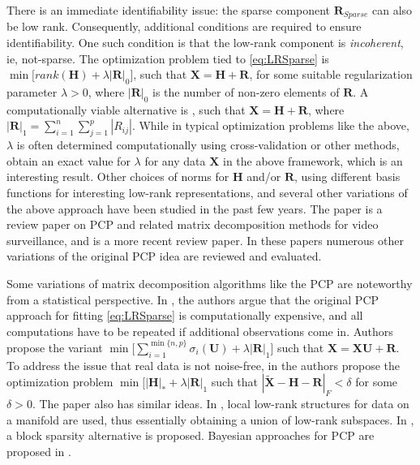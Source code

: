\documentclass[ss]{imsart}
\newcommand{\vecH}{{\mathbf {H}}}
\newcommand{\vecR}{{\mathbf {R}}}
\newcommand{\vecU}{{\mathbf {U}}}
\newcommand{\vecX}{{\mathbf {X}}}
\def\baq#1\eaq{\begin{align}#1\end{align}}
\theoremstyle{Example}
\newcommand{\attention}[1]{{\color{red}{\textbf{[ATTENTION:#1]}}}}
\begin{document}
There is an immediate identifiability issue: the sparse component $\vecR_{Sparse}$ 
can also be low rank. Consequently, additional conditions are required to ensure identifiability. One such condition is that the low-rank component is \textit{incoherent}, ie, not-sparse. The optimization problem tied to \eqref{eq:LRSparse}  is $\min \bigl[ rank (\vecH) + \lambda | \vecR |_{0} \bigr]$, 
such that  ${\vecX} = \vecH + \vecR$, for some suitable regularization parameter 
$\lambda > 0$, where $| \vecR |_{0}$ is the number of non-zero elements of $\vecR$. 
A computationally viable alternative is
\baq
\min \bigl[  \sum_{i = 1}^{\min{\{n, p\}}} \sigma_{i} (\vecH) 
+ \lambda | \vecR |_{1} \bigr],
\label{eq:PCPursuit}
\eaq
 such that  ${\vecX} = \vecH + \vecR$, where 
$| \vecR |_{1} = \sum_{i = 1}^{n}\sum_{j = 1}^{p} | R_{i j} |$. 
While in typical optimization problems like the above, $\lambda$ is often determined computationally using cross-validation or other methods,  \cite{ref:JACM111_Candesetal_RPCA} 
obtain an exact value for $\lambda$ for any data $\vecX$ in the above framework, which is an interesting result. Other choices of norms for $\vecH$ and/or $\vecR$, using different basis functions for interesting low-rank representations, and several other variations of the above approach have been studied in the past few years. 
The paper \cite{ref:CVIU1422_RPCA_Review}  is a review paper on 
PCP and related matrix decomposition methods for video surveillance, and \cite{ref:ProceedingsIEEE181359_RPCA_Review} is a more recent review paper. In these papers numerous other variations of the original PCP idea are reviewed and evaluated. 

Some variations of matrix decomposition algorithms like the PCP 
are noteworthy from a statistical perspective.
In \cite{ref:TransactionsOnImageProcessing123794_PCA}, the authors argue that the original PCP approach for fitting \eqref{eq:LRSparse}  is computationally expensive, and all computations have to be repeated if additional observations come in. 
Authors propose the variant 
$\min \bigl[  \sum_{i = 1}^{\min{\{n, p\}}} \sigma_{i} (\vecU) 
+ \lambda | \vecR |_{1} \bigr]$ such that ${\vecX} =    {\vecX} \vecU  + \vecR$.
\attention{I need to state what is $U$ here.}
To address the issue that real data is not noise-free, in \cite{ref:IEEEISIT101518_RPCA} the authors propose the optimization problem 
$\min \bigl[ | \vecH |_{*} +  \lambda | \vecR |_{1}$
such that $| \tilde{\vecX} -    \vecH - \vecR |_{F} < \delta$ for some $\delta > 0$. The paper \cite{becker2011tfocs} also has similar ideas. 
In \cite{ref:ICASSP123925_RPCA}, local low-rank structures 
for data on a manifold are used, thus essentially obtaining a union of low-rank subspaces. In \cite{ref:ACISS101_RPCA}, a block sparsity alternative is proposed. Bayesian approaches for PCP are proposed in \cite{ref:TransactionsInImageProcessing113419_PCA_Bayesian, 
ref:IEEETransSignalProciessing123964_RPCA_Bayesian, ref:CSDA17144_RPCA_Bayesian}.
\end{document}
